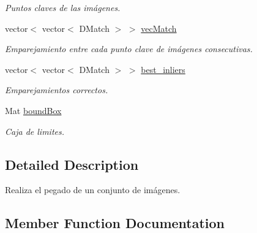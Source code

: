 \begin{DoxyCompactItemize}
\begin{DoxyCompactList}\small\item\em Puntos claves de las imágenes. \end{DoxyCompactList}\item 
\mbox{\label{classuav_1_1Stitcher_a31fb6a699efa47ae64fe109201ef216c}} 
vector$<$ vector$<$ D\+Match $>$ $>$ \mbox{\hyperlink{classuav_1_1Stitcher_a31fb6a699efa47ae64fe109201ef216c}{vec\+Match}}
\begin{DoxyCompactList}\small\item\em Emparejamiento entre cada punto clave de imágenes consecutivas. \end{DoxyCompactList}\item 
\mbox{\label{classuav_1_1Stitcher_a3aecc00facecd4f6952594b76cf4ea52}} 
vector$<$ vector$<$ D\+Match $>$ $>$ \mbox{\hyperlink{classuav_1_1Stitcher_a3aecc00facecd4f6952594b76cf4ea52}{best\+\_\+inliers}}
\begin{DoxyCompactList}\small\item\em Emparejamientos correctos. \end{DoxyCompactList}\item 
\mbox{\label{classuav_1_1Stitcher_a6f27d69501dd482cf217de22ca57fd13}} 
Mat \mbox{\hyperlink{classuav_1_1Stitcher_a6f27d69501dd482cf217de22ca57fd13}{bound\+Box}}
\begin{DoxyCompactList}\small\item\em Caja de limites. \end{DoxyCompactList}\end{DoxyCompactItemize}


\subsection{Detailed Description}
Realiza el pegado de un conjunto de imágenes. 

\subsection{Member Function Documentation}
\mbox{\label{classuav_1_1Stitcher_a0745fd6db5669c1f9bce1b637c2be163}} 
